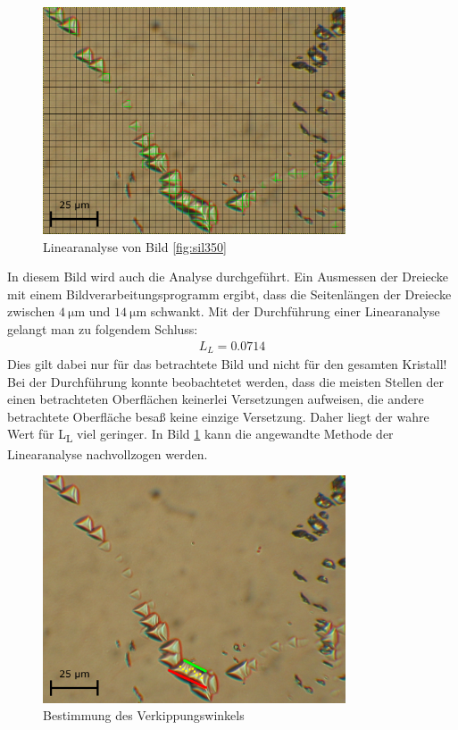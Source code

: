 \documentclass[german, %
parskip=full, %
bibliography=totoc, %
]{scrartcl}
\begin{document}
\begin{figure}[ht] 
  \centering
     \includegraphics[width=0.8\textwidth]{Silicium_3_50_mal2}
  \caption{Linearanalyse von Bild \ref{fig:sil350}}
  \label{fig:linana}
\end{figure}

In diesem Bild wird auch die Analyse durchgeführt. Ein Ausmessen der Dreiecke mit einem Bildverarbeitungsprogramm ergibt, dass die Seitenlängen der Dreiecke zwischen \(\SI{4}{\micro\meter}\) und \(\SI{14}{\micro\meter}\) schwankt. Mit der Durchführung einer Linearanalyse gelangt man zu folgendem Schluss:
\begin{align*}
L_L = 0.0714
\end{align*}
Dies gilt dabei nur für das betrachtete Bild und nicht für den gesamten Kristall! Bei der Durchführung konnte beobachtetet werden, dass die meisten Stellen der einen betrachteten Oberflächen keinerlei Versetzungen aufweisen, die andere betrachtete Oberfläche besaß keine einzige Versetzung. Daher liegt der wahre Wert für L\textsubscript{L} viel geringer. In Bild \ref{fig:linana} kann die angewandte Methode der Linearanalyse nachvollzogen werden.

\begin{figure}[ht] 
  \centering
     \includegraphics[width=0.8\textwidth]{Silicium_3_50_mal_verkippung}
  \caption{Bestimmung des Verkippungswinkels}
  \label{fig:verkippung}
\end{figure}
\end{document}
